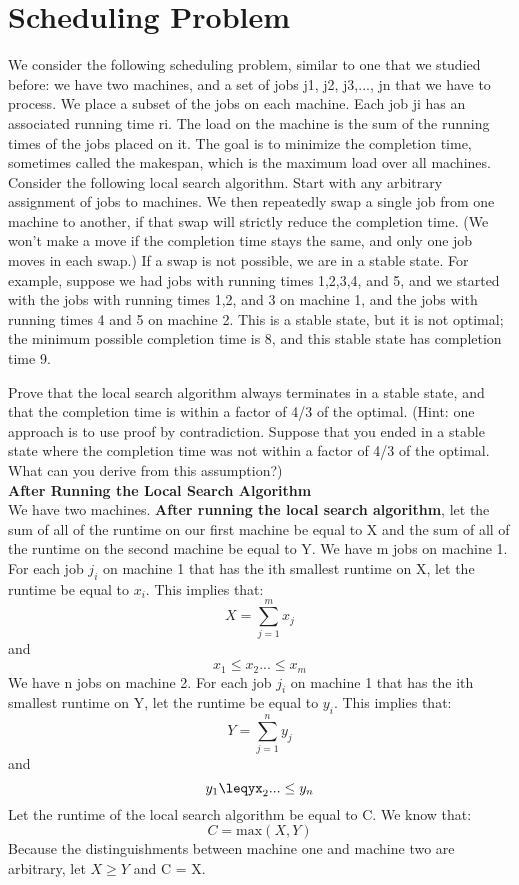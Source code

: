\documentclass[11pt, solution, letterpaper]{format}
\begin{document}
\section{Scheduling Problem}
We consider the following scheduling problem, similar to one that we studied before: we have two machines, and a set of jobs j1, j2, j3,..., jn that we have to process. We place a subset of the jobs on each machine. Each job ji has an associated running time ri. The load on the machine is the sum of the running times of the jobs placed on it. The goal is to minimize the completion time, sometimes called the makespan, which is the maximum load over all machines. Consider the following local search algorithm. Start with any arbitrary assignment of jobs to machines. We then repeatedly swap a single job from one machine to another, if that swap will strictly reduce the completion time. (We won’t make a move if the completion time stays the same, and only one job moves in each swap.) If a swap is not possible, we are in a stable state. For example, suppose we had jobs with running times 1,2,3,4, and 5, and we started with the jobs with running times 1,2, and 3 on machine 1, and the jobs with running times 4 and 5 on machine 2. This is a stable state, but it is not optimal; the minimum possible completion time is 8, and this stable state has completion time 9.

Prove that the local search algorithm always terminates in a stable state, and that the completion time is within a factor of 4/3 of the optimal. (Hint: one approach is to use proof by contradiction. Suppose that you ended in a stable state where the completion time was not within a factor of 4/3 of the optimal. What can you derive from this assumption?)\\

\textbf{After Running the Local Search Algorithm}\\
We have two machines. \textbf{After running the local search algorithm}, let the sum of all of the runtime on our first machine be equal to X and the sum of all of the runtime on the second machine be equal to Y. We have m jobs on machine 1. For each job $j_i$ on machine 1 that has the ith smallest runtime on X, let the runtime be equal to $x_i$. This implies that:
$$X = \sum_{j=1}^{m} x_j$$
and
$$ x_1 \leq x_2 ... \leq x_m$$
We have n jobs on machine 2. For each job $j_i$ on machine 1 that has the ith smallest runtime on Y, let the runtime be equal to $y_i$. This implies that:
$$Y = \sum_{j=1}^{n} y_j$$
and
$$ y_1 \leqyx_2 ... \leq y_n$$
Let the runtime of the local search algorithm be equal to C.
We know that:
$$C = \text{max}(X, Y)$$
Because the distinguishments between machine one and machine two are arbitrary, let $X \geq Y$ and C = X.\\
\end{document}
